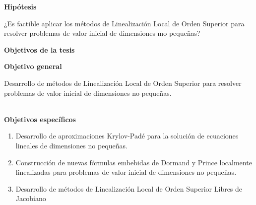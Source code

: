 \newpage

\begin{center}
	{\large \textbf{Hipótesis}}
\end{center}
¿Es factible aplicar los métodos de Linealización Local de Orden Superior para resolver problemas de valor inicial de dimensiones mo pequeñas?

\qquad

\begin{center}
	{\large \textbf{Objetivos de la tesis}}
\end{center}
\textbf{Objetivo general}

Desarrollo de métodos de Linealización Local de Orden Superior para resolver problemas de valor inicial de dimensiones no pequeñas.

\qquad\\
\textbf{Objetivos específicos}

\begin{enumerate}
	\item Desarrollo de aproximaciones Krylov-Padé para la solución de ecuaciones lineales de dimensiones no pequeñas.
	\item Construcción de nuevas fórmulas embebidas de Dormand y Prince localmente linealizadas para problemas de valor inicial de dimensiones no pequeñas.
	\item Desarrollo de métodos de Linealización Local de Orden Superior Libres de Jacobiano
\end{enumerate}
